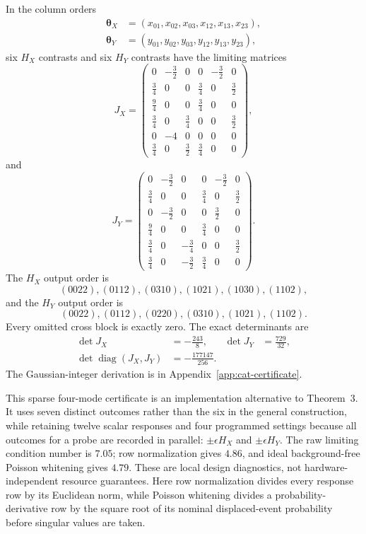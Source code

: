 \documentclass[aps,pra,reprint,amsmath,amssymb,superscriptaddress,longbibliography]{revtex4-2}
\newcommand{\btheta}{\bm{\theta}}
\begin{document}
In the column orders
\begin{align}
 \btheta_X&=(x_{01},x_{02},x_{03},x_{12},x_{13},x_{23}),\nonumber\\
 \btheta_Y&=(y_{01},y_{02},y_{03},y_{12},y_{13},y_{23}),
\end{align}
six $H_X$ contrasts and six $H_Y$ contrasts have the limiting matrices
\begin{equation}
 J_X=
 \begin{pmatrix}
0&-\frac32&0&0&-\frac32&0\\
\frac34&0&0&\frac34&0&\frac32\\
\frac94&0&0&\frac34&0&0\\
\frac34&0&\frac34&0&0&\frac32\\
0&-4&0&0&0&0\\
\frac34&0&\frac32&\frac34&0&0
\end{pmatrix},
\label{eq:jx}
\end{equation}
and
\begin{equation}
 J_Y=
 \begin{pmatrix}
0&-\frac32&0&0&-\frac32&0\\
\frac34&0&0&\frac34&0&\frac32\\
0&-\frac32&0&0&\frac32&0\\
\frac94&0&0&\frac34&0&0\\
\frac34&0&-\frac34&0&0&\frac32\\
\frac34&0&-\frac32&\frac34&0&0
\end{pmatrix}.
\label{eq:jy}
\end{equation}
The $H_X$ output order is
\begin{equation}
(0022),(0112),(0310),(1021),(1030),(1102),
\label{eq:x-outputs}
\end{equation}
and the $H_Y$ output order is
\begin{equation}
(0022),(0112),(0220),(0310),(1021),(1102).
\label{eq:y-outputs}
\end{equation}
Every omitted cross block is exactly zero.  The exact determinants are
\begin{align}
 \det J_X&=-\frac{243}{8},&
 \det J_Y&=\frac{729}{32},\nonumber\\
 \det\operatorname{diag}(J_X,J_Y)
 &=-\frac{177147}{256}.
\label{eq:cat-determinants}
\end{align}
The Gaussian-integer derivation is in
Appendix~\ref{app:cat-certificate}.

This sparse four-mode certificate is an implementation alternative to
Theorem~3.  It uses seven distinct outcomes rather than the six in the
general construction, while retaining twelve scalar responses and four
programmed settings because all outcomes for a probe are recorded in
parallel: $\pm\epsilon H_X$ and $\pm\epsilon H_Y$.  The raw
limiting condition number is $7.05$; row normalization gives $4.86$, and
ideal background-free Poisson whitening gives $4.79$.  These are local
design diagnostics, not hardware-independent resource guarantees.  Here
row normalization divides every response row by its Euclidean norm, while
Poisson whitening divides a probability-derivative row by the square root
of its nominal displaced-event probability before singular values are
taken.
\end{document}
